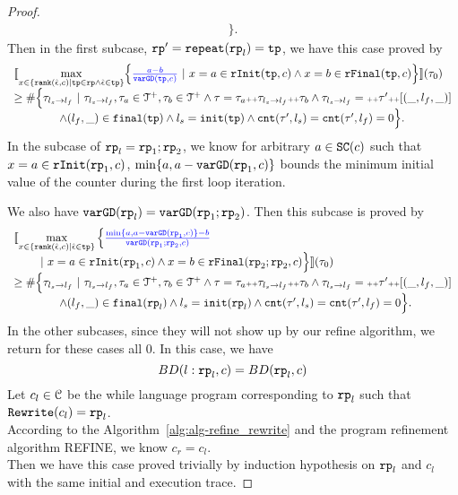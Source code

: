 \begin{proof}
\[\begin{array}{l}
    \Big\}.
    \end{array}
\]
Then in the first subcase, $\mathtt{rp}' = \mathtt{repeat}(\mathtt{rp}_l) = \mathtt{tp}$, we have this case proved by
\[
  \begin{array}{l}
    \econfig{
      \max\limits_{x \in \left\{ \locbound(\absevent, c) | \tpath \in \rprog \land \absevent \in \tpath \right\}}
      \left\{ \highlight{\frac{a - b}{\varGD(\tpath, c)}} ~\vert~
      x = a \in \rfinit(\tpath, c)
      \land x = b \in \rffinal(\tpath, c)
      \right\} 
    }(\trace_0) \\
    \geq
    \# \Big\{\trace_{l_s \to l_f} ~\vert~ \trace_{l_s \to l_f}, \trace_a \in \ftdom, \trace_b \in \ftdom
    \land \trace = \trace_a \tracecat \trace_{l_s \to l_f} \tracecat \trace_b
    \land \trace_{l_s \to l_f} = \tracecat \trace' \tracecat [(\_, l_f, \_)]
    \\ \qquad \qquad
    \land (l_{f}, \_) \in \absfinal(\tpath)
    \land l_s = \absinit(\tpath)
    \land \counter(\trace', l_s) = \counter(\trace', l_f) = 0 
    \Big\}.
    \end{array}
\]
In the subcase of $\mathtt{rp}_l = \mathtt{rp}_1; \mathtt{rp}_2$, 
we know for arbitrary $a \in \mathtt{SC}(c)$ such that $x = a \in \mathtt{rInit}(\mathtt{rp}_1, c)$,
$\min\{ a, a - \mathtt{varGD}(\mathtt{rp}_1, c) \}$ bounds the minimum initial value of the counter during the first loop iteration.

We also have  $\mathtt{varGD}(\mathtt{rp}_l) = \mathtt{varGD}(\mathtt{rp}_1;\mathtt{rp}_2)$.
Then this subcase is proved by 
\[
  \begin{array}{l}
    \econfig{
      \max\limits_{x \in \left\{ \locbound(\absevent, c) | \absevent \in \tpath \right\}} 
      \Big\{ \highlight{\frac{\min\{ a, a - \varGD(\rprog_1, c) \} - b}{\varGD(\rprog_1;\rprog_2, c)}}  
      \\ \qquad 
      ~\vert~
      x = a \in \rfinit(\rprog_1, c)
      \land x = b \in \rffinal(\rprog_2;\rprog_2, c)
      \Big\}  
    }(\trace_0) \\
    \geq
    \# \Big\{\trace_{l_s \to l_f} ~\vert~ \trace_{l_s \to l_f}, \trace_a \in \ftdom, \trace_b \in \ftdom
    \land \trace = \trace_a \tracecat \trace_{l_s \to l_f} \tracecat \trace_b
    \land \trace_{l_s \to l_f} = \tracecat \trace' \tracecat [(\_, l_f, \_)]
    \\ \qquad \qquad
    \land (l_{f}, \_) \in \absfinal(\rprog_l)
    \land l_s = \absinit(\rprog_l)
    \land \counter(\trace', l_s) = \counter(\trace', l_f) = 0 
    \Big\}.
    \end{array}
\]
In the other subcases, since they will not show up by our refine algorithm, we return for these cases all $0$.
In this case, we have
\[
  BD(l: \mathtt{rp}_l, c) = BD(\mathtt{rp}_l, c)
\]
Let $c_l \in \mathcal{C}$ be the while language program corresponding to $\mathtt{rp}_l$ such that $\mathtt{Rewrite}(c_l) = \mathtt{rp}_l$.
\\
According to the Algorithm~\ref{alg:alg-refine_rewrite} and the program refinement algorithm REFINE, we know
$c_r = c_l$.
\\
Then we have this case proved trivially by induction hypothesis on $\mathtt{rp}_l$ and $c_l$ with the same initial and execution trace.


\end{proof}

